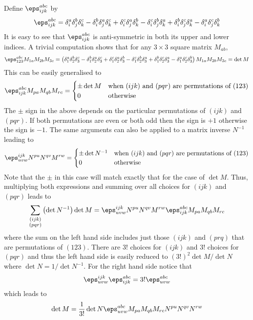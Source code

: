\documentclass[12pt]{cdblatex}
\begin{document}
Define $\eps^{abc}_{ijk}$ by
\begin{align}
   \eps^{abc}_{ijk} =
        \delta^a_i \delta^b_j \delta^c_k - \delta^b_i \delta^a_j \delta^c_k
      + \delta^c_i \delta^a_j \delta^b_k - \delta^c_i \delta^b_j \delta^a_k
      + \delta^b_i \delta^c_j \delta^a_k - \delta^a_i \delta^c_j \delta^b_k
\end{align}
It is easy to see that $\eps^{abc}_{ijk}$ is anti-symmetric in both its upper and lower
indices. A trivial computation shows that for any $3{}\times{}3$ square matrix $M_{ab}$,
\begin{align}
   \eps^{abc}_{123} M_{1a} M_{2b} M_{3c}
   = \left(
          \delta^a_1 \delta^b_2 \delta^c_3 - \delta^b_1 \delta^a_2 \delta^c_3
        + \delta^c_1 \delta^a_2 \delta^b_3 - \delta^c_1 \delta^b_2 \delta^a_3
        + \delta^b_1 \delta^c_2 \delta^a_3 - \delta^a_1 \delta^c_2 \delta^b_3
     \right)M_{1a} M_{2b} M_{3c}
   = \det M
\end{align}
This can be easily generalised to
\begin{align}
   \eps^{abc}_{ijk} M_{pa} M_{qb} M_{rc}
   =
   \begin{cases}
      \pm \det M &\text{when $(ijk)$ and $(pqr)$ are permutations of $(123)$}\\
      0 & \text{otherwise}
   \end{cases}
\end{align}
The $\pm$ sign in the above depends on the particular permutations of $(ijk)$ and $(pqr)$. If
both permutations are even or both odd then the sign is $+1$ otherwise the sign is $-1$.
The same arguments can also be applied to a matrix inverse $N^{-1}$ leading to
\begin{align}
   \eps^{ijk}_{uvw} N^{pu} N^{qv} M^{rw}
   =
   \begin{cases}
      \pm \det {N^{-1}} &\text{when $(ijk)$ and $(pqr)$ are permutations of $(123)$}\\
      0 & \text{otherwise}
   \end{cases}
\end{align}
Note that the $\pm$ in this case will match exactly that for the case of $\det M$. Thus,
multiplying both expressions and summing over all choices for $(ijk)$ and $(pqr)$ leads
to
\begin{align}
   \sum_{\substack{(ijk)\\(pqr)}}\left(\det N^{-1}\right) \det M
   = \eps^{ijk}_{uvw} N^{pu} N^{qv} M^{rw} \eps^{abc}_{ijk} M_{pa} M_{qb} M_{rc}
\end{align}
where the sum on the left hand side includes just those $(ijk)$ and $(prq)$ that are
permutations of $(123)$. There are $3!$ choices for $(ijk)$ and $3!$ choices for
$(pqr)$ and thus the left hand side is easily reduced to $(3!)^2 \det M/\det N$ where
$\det N = 1/\det N^{-1}$. For the right hand side notice that
\begin{align}
   \eps^{ijk}_{uvw} \eps^{abc}_{ijk} = 3! \eps^{abc}_{uvw}
\end{align}
which leads to
\begin{align}
   \det M = \frac{1}{3!} \det N \eps^{abc}_{uvw} M_{pa} M_{qb} M_{rc} N^{pu} N^{qv} N^{rw}
\end{align}
\end{document}
